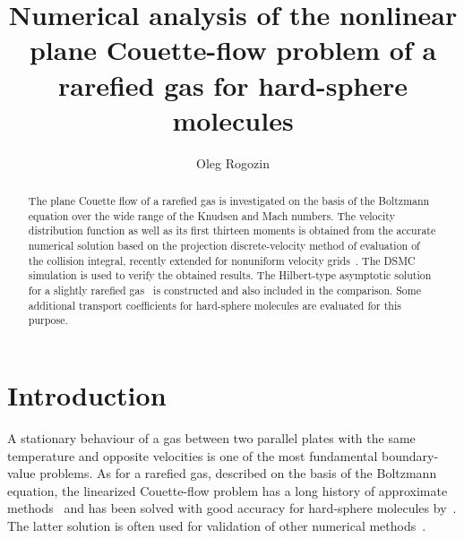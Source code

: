 \documentclass[]{jfm}
\begin{document}
\newtheorem{lemma}{Lemma}

\title{
    Numerical analysis of the nonlinear plane Couette-flow problem of a rarefied gas for hard-sphere molecules
}

\author{
    Oleg Rogozin
}

\maketitle

\begin{abstract}
    The plane Couette flow of a rarefied gas is investigated on the basis of the Boltzmann equation
    over the wide range of the Knudsen and Mach numbers.
    The velocity distribution function as well as its first thirteen moments is obtained from
    the accurate numerical solution based on the projection discrete-velocity method
    of evaluation of the collision integral, recently extended for nonuniform velocity grids~\citep{Dodulad2015}.
    The DSMC simulation is used to verify the obtained results.
    The Hilbert-type asymptotic solution for a slightly rarefied gas~\citep[according to][]{Sone2000}
    is constructed and also included in the comparison.
    Some additional transport coefficients for hard-sphere molecules are evaluated for this purpose.
\end{abstract}


\section{Introduction}

A stationary behaviour of a gas between two parallel plates with the same temperature
and opposite velocities is one of the most fundamental boundary-value problems.
As for a rarefied gas, described on the basis of the Boltzmann equation,
the linearized Couette-flow problem has a long history of approximate methods~\citep{Willis1962}
and has been solved with good accuracy for hard-sphere molecules by~\citet{Ohwada1990}.
The latter solution is often used for validation of other numerical methods~\citep[see e.g.][]{Fan2001,Aidun2010}.
\end{document}
